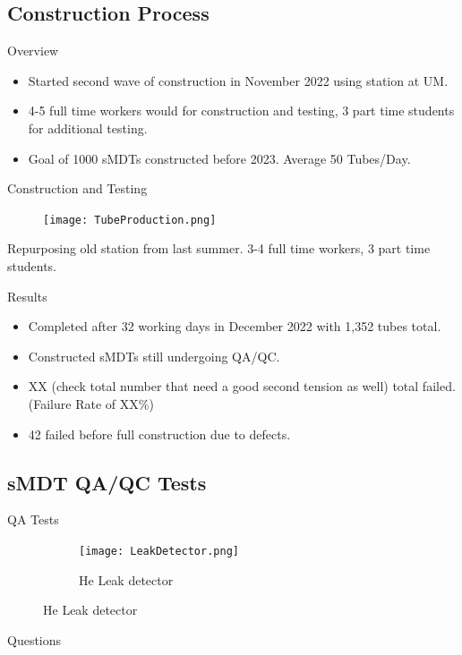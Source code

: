 \documentclass{beamer}
\begin{document}
	\subsection{Construction Process}
		\begin{frame}{Overview}
			\begin{itemize}
				\item Started second wave of construction in November 2022 using station at UM.
				\item 4-5 full time workers would for construction and testing, 3 part time students for additional testing. 
				\item Goal of 1000 sMDTs constructed before 2023. Average 50 Tubes/Day. 
			\end{itemize}
		\end{frame}
		\begin{frame}{Construction and Testing}
			\begin{figure}
				\texttt{[image: TubeProduction.png]}
			\end{figure}
			\small Repurposing old station from last summer. 
			3-4 full time workers, 3 part time students. 
		\end{frame}
		\begin{frame}{Results}
			\begin{itemize}
				\item Completed after 32 working days in December 2022 with 1,352 tubes total. 
				\item Constructed sMDTs still undergoing QA/QC. 
				\item XX (check total number that need a good second tension as well) total failed. (Failure Rate of XX\%)
				\item 42 failed before full construction due to defects. 
			\end{itemize}
		\end{frame}
	\subsection{sMDT QA/QC Tests}
		\begin{frame}{QA Tests}
			\begin{figure}
				\begin{subfigure}[b]{0.25\pdfpagewidth}
					\texttt{[image: LeakDetector.png]}
					\caption{He Leak detector}
				\end{subfigure}
			\end{figure}
		\end{frame}
		\begin{frame}{Questions}
			\tableofcontents
		\end{frame}
\end{document}
